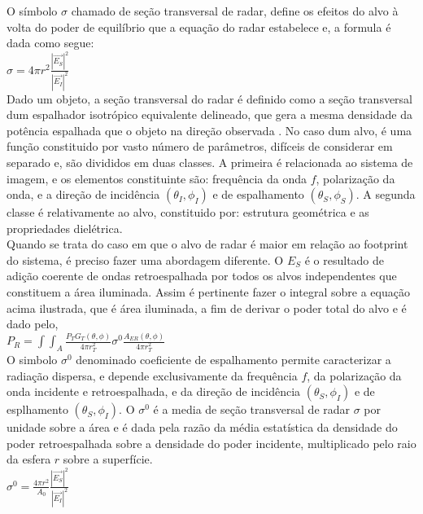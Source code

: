 \documentclass[a4paper,12pt]{article}
\begin{document}
O símbolo $\sigma$ chamado de seção transversal de radar, define os efeitos do alvo à volta do poder de equilíbrio que a equação do radar estabelece e,  a formula é dada como segue:\\

$\sigma = 4\pi r^2 \frac{|\vec{E_{S}}|^2}{|\vec{E_{I}}|^2}$\\

Dado um objeto, a seção transversal do radar é definido como a seção transversal dum espalhador isotrópico equivalente delineado, que gera a mesma densidade da potência espalhada que o objeto na direção observada \cite{jong:2009}. No caso dum alvo, é uma função constituido por vasto número de parâmetros, difíceis de considerar em separado e, são divididos em duas classes. A primeira é relacionada ao sistema de imagem, e os elementos constituinte são: frequência da onda $f$, polarização da onda, e a direção de incidência $(\theta_{I}, \phi_{I})$ e de espalhamento $(\theta_{S}, \phi_{S})$. A segunda classe é relativamente ao alvo, constituido por: estrutura geométrica e as propriedades dielétrica.\\

Quando se trata do caso em que o alvo de radar é maior em relação ao footprint do sistema, é preciso fazer uma abordagem diferente. O $E_{S}$ é o resultado de adição coerente de ondas retroespalhada por todos os alvos independentes que constituem a área iluminada. Assim é pertinente fazer o integral sobre a equação acima ilustrada, que é área iluminada, a fim de derivar o poder total do alvo e é dado pelo,\\

$P_{R}=\int\int_{A}^{} \frac{P_{T}G_{T}(\theta, \phi)}{4\pi r^2_{T}}\sigma^0\frac{A_{ER}(\theta, \phi)}{4\pi r^2_{T}}$\\

O simbolo $\sigma^0$ denominado coeficiente de espalhamento permite caracterizar a radiação dispersa, e depende exclusivamente da frequência $f$, da polarização da onda incidente e retroespalhada, e da direção de incidência $(\theta_{S}, \phi_{I})$ e de esplhamento $(\theta_{S}, \phi_{I})$. O $\sigma^0$ é a media de seção transversal de radar $\sigma$ por unidade sobre a área e é dada pela razão da média estatística da densidade do poder retroespalhada sobre a densidade do poder incidente, multiplicado pelo raio da esfera $r$ sobre a superfície.\\

$\sigma^0 = \frac{4\pi r^2}{A_{0}} \frac{|\vec{E_{S}}|^2}{|\vec{E_{I}}|^2}$\\
\end{document}
